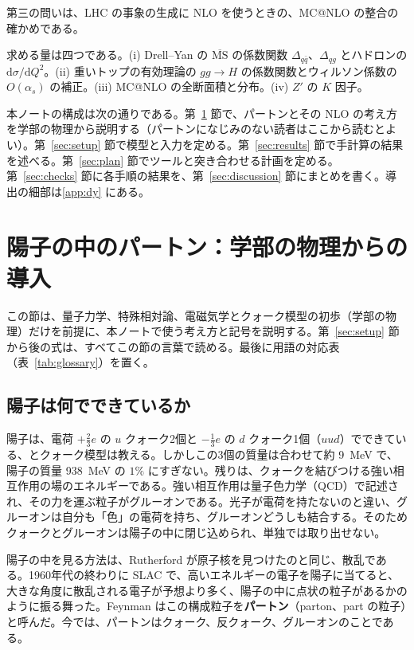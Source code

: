 \documentclass[a4paper,10pt]{ltjsarticle}
\newcommand{\dd}{\mathrm{d}}
\newcommand{\MSbar}{\overline{\mathrm{MS}}}
\begin{document}
第三の問いは、LHC の事象の生成に NLO を使うときの、MC@NLO の整合の確かめである。

求める量は四つである。(i) Drell--Yan の $\MSbar$ の係数関数 $\Delta_{q\bar q}$、$\Delta_{qg}$ とハドロンの $\dd\sigma/\dd Q^2$。(ii) 重いトップの有効理論の $gg\to H$ の係数関数とウィルソン係数の $O(\alpha_s)$ の補正。(iii) MC@NLO の全断面積と分布。(iv) $Z'$ の $K$ 因子。

本ノートの構成は次の通りである。第~\ref{sec:primer} 節で、パートンとその NLO の考え方を学部の物理から説明する（パートンになじみのない読者はここから読むとよい）。第~\ref{sec:setup} 節で模型と入力を定める。第~\ref{sec:results} 節で手計算の結果を述べる。第~\ref{sec:plan} 節でツールと突き合わせる計画を定める。第~\ref{sec:checks} 節に各手順の結果を、第~\ref{sec:discussion} 節にまとめを書く。導出の細部は\ref{app:dy} にある。

\section{陽子の中のパートン：学部の物理からの導入}\label{sec:primer}

この節は、量子力学、特殊相対論、電磁気学とクォーク模型の初歩（学部の物理）だけを前提に、本ノートで使う考え方と記号を説明する。第~\ref{sec:setup} 節から後の式は、すべてこの節の言葉で読める。最後に用語の対応表（表~\ref{tab:glossary}）を置く。

\subsection{陽子は何でできているか}\label{sec:proton}

陽子は、電荷 $+\frac23e$ の $u$ クォーク2個と $-\frac13e$ の $d$ クォーク1個（$uud$）でできている、とクォーク模型は教える。しかしこの3個の質量は合わせて約 9~MeV で、陽子の質量 938~MeV の $1\%$ にすぎない。残りは、クォークを結びつける強い相互作用の場のエネルギーである。強い相互作用は量子色力学（QCD）で記述され、その力を運ぶ粒子がグルーオンである。光子が電荷を持たないのと違い、グルーオンは自分も「色」の電荷を持ち、グルーオンどうしも結合する。そのためクォークとグルーオンは陽子の中に閉じ込められ、単独では取り出せない。

陽子の中を見る方法は、Rutherford が原子核を見つけたのと同じ、散乱である。1960年代の終わりに SLAC で、高いエネルギーの電子を陽子に当てると、大きな角度に散乱される電子が予想より多く、陽子の中に点状の粒子があるかのように振る舞った。Feynman はこの構成粒子を\textbf{パートン}（parton、part の粒子）と呼んだ。今では、パートンはクォーク、反クォーク、グルーオンのことである。
\end{document}
